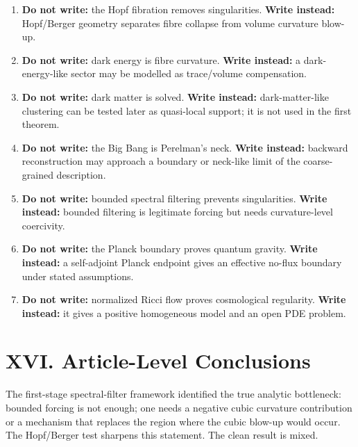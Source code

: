 \documentclass[
]{article}
\begin{document}
\begin{enumerate}
\def\labelenumi{(\arabic{enumi})}
\setcounter{enumi}{22}
\item
  \textbf{Do not write:} the Hopf fibration removes singularities. \textbf{Write instead:} Hopf/Berger geometry separates fibre collapse from volume curvature blow-up.
\item
  \textbf{Do not write:} dark energy is fibre curvature. \textbf{Write instead:} a dark-energy-like sector may be modelled as trace/volume compensation.
\item
  \textbf{Do not write:} dark matter is solved. \textbf{Write instead:} dark-matter-like clustering can be tested later as quasi-local support; it is not used in the first theorem.
\item
  \textbf{Do not write:} the Big Bang is Perelman's neck. \textbf{Write instead:} backward reconstruction may approach a boundary or neck-like limit of the coarse-grained description.
\item
  \textbf{Do not write:} bounded spectral filtering prevents singularities. \textbf{Write instead:} bounded filtering is legitimate forcing but needs curvature-level coercivity.
\item
  \textbf{Do not write:} the Planck boundary proves quantum gravity. \textbf{Write instead:} a self-adjoint Planck endpoint gives an effective no-flux boundary under stated assumptions.
\item
  \textbf{Do not write:} normalized Ricci flow proves cosmological regularity. \textbf{Write instead:} it gives a positive homogeneous model and an open PDE problem.
\end{enumerate}

\section{XVI. Article-Level Conclusions}\label{xvi.-article-level-conclusions}

The first-stage spectral-filter framework identified the true analytic bottleneck: bounded forcing is not enough; one needs a negative cubic curvature contribution or a mechanism that replaces the region where the cubic blow-up would occur. The Hopf/Berger test sharpens this statement. The clean result is mixed.
\end{document}
